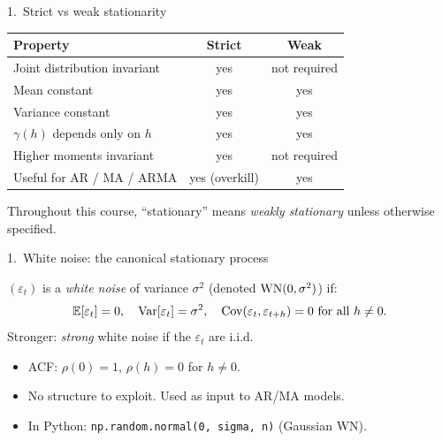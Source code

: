 \documentclass[aspectratio=169]{beamer}
\begin{document}
\begin{frame}{1.~Strict vs weak stationarity}
  \begin{center}
  \begin{tabular}{lcc}
    \toprule
    \textbf{Property}                & \textbf{Strict} & \textbf{Weak} \\
    \midrule
    Joint distribution invariant     & yes             & not required \\
    Mean constant                    & yes             & yes          \\
    Variance constant                & yes             & yes          \\
    $\gamma(h)$ depends only on $h$  & yes             & yes          \\
    Higher moments invariant         & yes             & not required \\
    Useful for AR / MA / ARMA        & yes (overkill)  & yes          \\
    \bottomrule
  \end{tabular}
  \end{center}
  \medskip
  \begin{infobox}
    Throughout this course, ``stationary'' means \emph{weakly
    stationary} unless otherwise specified.
  \end{infobox}
\end{frame}

\begin{frame}{1.~White noise: the canonical stationary process}
  \begin{defbox}
    $(\varepsilon_t)$ is a \emph{white noise} of variance $\sigma^2$
    (denoted $\mathrm{WN}(0, \sigma^2)$) if:
    \[
      \mathbb{E}[\varepsilon_t] = 0, \quad \mathrm{Var}[\varepsilon_t] = \sigma^2,
      \quad \mathrm{Cov}(\varepsilon_t, \varepsilon_{t+h}) = 0 \text{ for all } h \neq 0.
    \]
    Stronger: \emph{strong} white noise if the $\varepsilon_t$ are i.i.d.
  \end{defbox}
  \medskip
  \begin{itemize}
    \item ACF: $\rho(0) = 1$, $\rho(h) = 0$ for $h \neq 0$.
    \item No structure to exploit. Used as input to AR/MA models.
    \item In Python: \texttt{np.random.normal(0, sigma, n)} (Gaussian WN).
  \end{itemize}
\end{frame}
\end{document}
